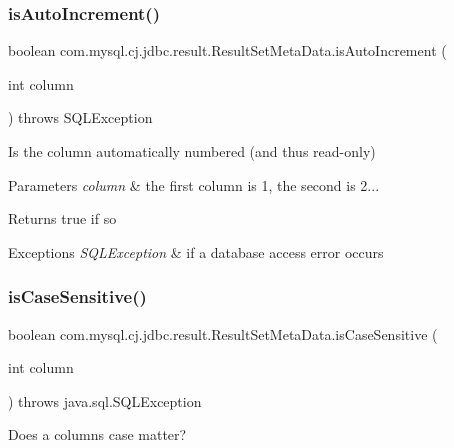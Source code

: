 \subsubsection{\texorpdfstring{is\+Auto\+Increment()}{isAutoIncrement()}}
{\footnotesize\ttfamily boolean com.\+mysql.\+cj.\+jdbc.\+result.\+Result\+Set\+Meta\+Data.\+is\+Auto\+Increment (\begin{DoxyParamCaption}\item[{int}]{column }\end{DoxyParamCaption}) throws S\+Q\+L\+Exception}

Is the column automatically numbered (and thus read-\/only)


\begin{DoxyParams}{Parameters}
{\em column} & the first column is 1, the second is 2...\\
\hline
\end{DoxyParams}
\begin{DoxyReturn}{Returns}
true if so
\end{DoxyReturn}

\begin{DoxyExceptions}{Exceptions}
{\em S\+Q\+L\+Exception} & if a database access error occurs \\
\hline
\end{DoxyExceptions}
\mbox{\label{classcom_1_1mysql_1_1cj_1_1jdbc_1_1result_1_1_result_set_meta_data_a100a9826a3a772fc38490ed65d08306d}} 
\subsubsection{\texorpdfstring{is\+Case\+Sensitive()}{isCaseSensitive()}}
{\footnotesize\ttfamily boolean com.\+mysql.\+cj.\+jdbc.\+result.\+Result\+Set\+Meta\+Data.\+is\+Case\+Sensitive (\begin{DoxyParamCaption}\item[{int}]{column }\end{DoxyParamCaption}) throws java.\+sql.\+S\+Q\+L\+Exception}

Does a column\textquotesingle{}s case matter?


